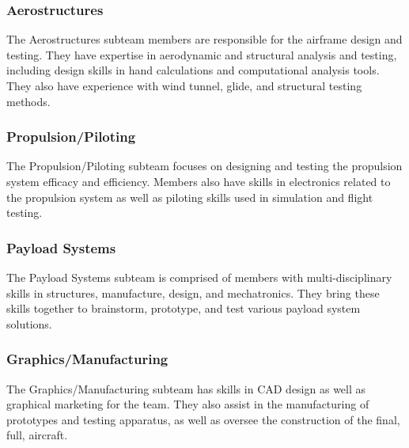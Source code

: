 \subsubsection{Aerostructures} The Aerostructures subteam members are responsible for the airframe design and testing. They have expertise in aerodynamic and structural analysis and testing, including design skills in hand calculations and computational analysis tools. They also have experience with wind tunnel, glide, and structural testing methods.
\subsubsection{Propulsion/Piloting} The Propulsion/Piloting subteam focuses on designing and testing the propulsion system efficacy and efficiency. Members also have skills in electronics related to the propulsion system as well as piloting skills used in simulation and flight testing.
\subsubsection{Payload Systems} The Payload Systems subteam is comprised of members with multi-disciplinary skills in structures, manufacture, design, and mechatronics. They bring these skills together to brainstorm, prototype, and test various payload system solutions.
\subsubsection{Graphics/Manufacturing} The Graphics/Manufacturing subteam has skills in CAD design as well as graphical marketing for the team. They also assist in the manufacturing of prototypes and testing apparatus, as well as oversee the construction of the final, full, aircraft.